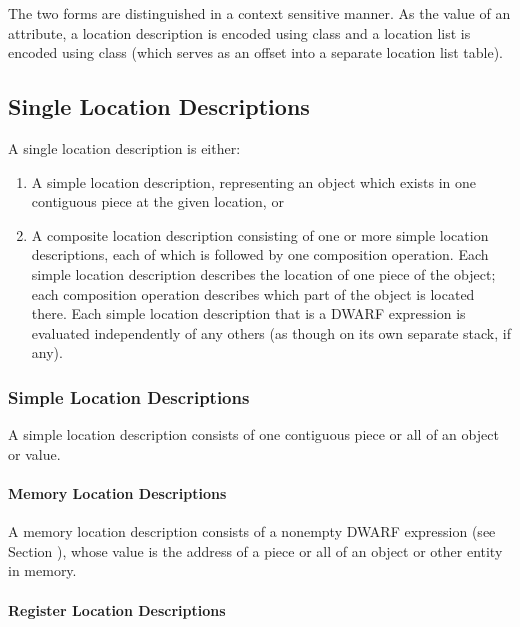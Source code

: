 The two forms are distinguished in a context sensitive
manner. As the value of an attribute, a location description
is encoded using class   
and a location list is encoded
using class  (which serves as an offset into a
separate location list table).


\subsection{Single Location Descriptions}
A single location description is either:

\begin{enumerate}[1]
\item A simple location description, representing an object
which exists in one contiguous piece at the given location, or 
\item A composite location description consisting of one or more
simple location descriptions, each of which is followed by
one composition operation. Each simple location description
describes the location of one piece of the object; each
composition operation describes which part of the object is
located there. Each simple location description that is a
DWARF expression is evaluated independently of any others
(as though on its own separate stack, if any). 
\end{enumerate}



\subsubsection{Simple Location Descriptions}

A simple location description consists of one 
contiguous piece or all of an object or value.


\paragraph{Memory Location Descriptions}

A memory location description consists of a non\dash empty DWARF
expression (see 
Section 
), whose value is the address of
a piece or all of an object or other entity in memory.

\paragraph{Register Location Descriptions}

